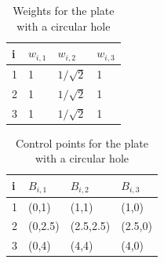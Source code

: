 \documentclass{article}
\begin{document}
\begin{table}
\begin{center}
\caption{Weights for the plate with a circular hole}\label{table:weights}
\begin{tabular}{l@{\hskip 1cm}l@{\hskip 1cm}l@{\hskip 1cm}l}
\hline
i    & $w_{i,1} $ & $w_{i,2}$ & $w_{i,3}$\\
\hline
1    & 1    & ${1}/{\sqrt{2}}$ & 1 \\
2    & 1    & ${1}/{\sqrt{2}}$ & 1 \\
3    & 1    & ${1}/{\sqrt{2}}$ & 1 \\
\hline
\end{tabular}
\end{center}
\end{table}

\begin{table}
\begin{center}
\caption{Control points for the plate with a circular hole}\label{table:control_points}
\begin{tabular}{l@{\hskip 1cm}l@{\hskip 1cm}l@{\hskip 1cm}l}
\hline
i    & $B_{i,1} $ & $B_{i,2}$ & $B_{i,3}$\\
\hline
1    & (0,1)    & (1,1)     & (1,0)   \\
2    & (0,2.5)  & (2.5,2.5) & (2.5,0) \\
3    & (0,4)    & (4,4)     & (4,0)   \\
\hline
\end{tabular}
\end{center}
\end{table}
\end{document}
